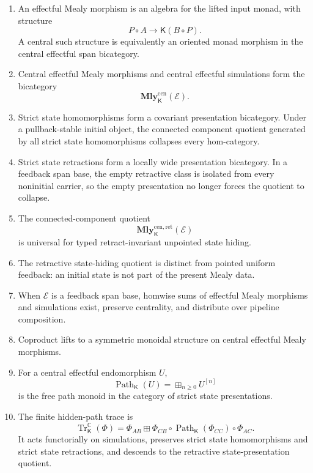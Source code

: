\begin{enumerate}
    \item An effectful Mealy morphism is an algebra for the lifted input
    monad, with structure
    \[
        P\circ A
        \longrightarrow
        \mathsf K(B\circ P).
    \]
    A central such structure is equivalently an oriented monad morphism in
    the central effectful span bicategory.

    \item Central effectful Mealy morphisms and central effectful simulations
    form the bicategory
    \[
        \mathbf{Mly}^{\mathrm{cen}}_{\mathsf K}(\mathcal E).
    \]

    \item Strict state homomorphisms form a covariant presentation
    bicategory.  Under a pullback-stable initial object, the connected
    component quotient generated by all strict state homomorphisms collapses
    every hom-category.

    \item Strict state retractions form a locally wide presentation
    bicategory.  In a feedback span base, the empty retractive class is
    isolated from every noninitial carrier, so the empty presentation no
    longer forces the quotient to collapse.

    \item The connected-component quotient
    \[
        \mathbf{Mly}^{\mathrm{cen},\mathrm{ret}}_{\mathsf K}(\mathcal E)
    \]
    is universal for typed retract-invariant unpointed state hiding.

    \item The retractive state-hiding quotient is distinct from pointed
    uniform feedback: an initial state is not part of the present Mealy
    data.

    \item When \(\mathcal E\) is a feedback span base, homwise sums of
    effectful Mealy morphisms and simulations exist, preserve centrality, and
    distribute over pipeline composition.

    \item Coproduct lifts to a symmetric monoidal structure on central
    effectful Mealy morphisms.

    \item For a central effectful endomorphism \(U\),
    \[
        \operatorname{Path}_{\mathsf K}(U)
        =
        \boxplus_{n\geq0}U^{[n]}
    \]
    is the free path monoid in the category of strict state presentations.

    \item The finite hidden-path trace is
    \[
        \operatorname{Tr}^{\mathbb C}_{\mathsf K}(\Phi)
        =
        \Phi_{AB}
        \boxplus
        \Phi_{CB}
        \circ
        \operatorname{Path}_{\mathsf K}(\Phi_{CC})
        \circ
        \Phi_{AC}.
    \]
    It acts functorially on simulations, preserves strict state
    homomorphisms and strict state retractions, and descends to the retractive
    state-presentation quotient.


\end{enumerate}
